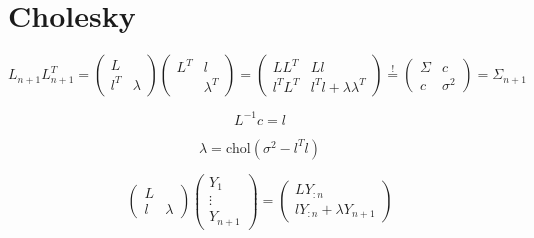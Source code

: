 \section{Cholesky}

\[
	L_{n+1}L_{n+1}^T=\begin{pmatrix}
		L & \\
		l^T &\lambda
	\end{pmatrix}
	\begin{pmatrix}
		L^T &  l\\
		&\lambda^T
	\end{pmatrix}
	= \begin{pmatrix}
		L L^T & L l\\
		l^T L^T & l^T l + \lambda\lambda^T
	\end{pmatrix}
	\overset!= \begin{pmatrix}
		\Sigma & c \\
		c & \sigma^2
	\end{pmatrix} = \Sigma_{n+1}
\]

\[
	L^{-1}c = l
\]

\[
	\lambda = \text{chol}(\sigma^2 - l^T l)
\]


\[
	\begin{pmatrix}
		L & \\
		l & \lambda
	\end{pmatrix}
	\begin{pmatrix}
		Y_1\\
		\vdots\\
		Y_{n+1}
	\end{pmatrix}
	= \begin{pmatrix}
		L Y_{:n} \\
	 	l Y_{:n} + \lambda Y_{n+1}
	\end{pmatrix}
\]